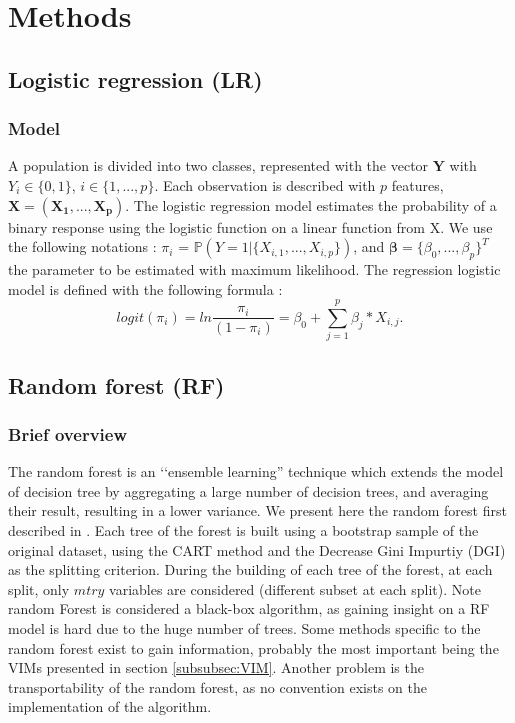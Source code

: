 \documentclass[12pt]{article}
\begin{document}
\newpage

\section{Methods}
\subsection{Logistic regression (LR)}
\subsubsection{Model}
A population is divided into two classes, represented with the vector $\bm{Y}$ with $Y_i\in\{{0,1}\}$, $i \in \{1,...,p\}$. Each observation is described with $p$ features, $\bm{X}=(\bm{X_1},...,\bm{X_p})$. The logistic regression model estimates the probability of a binary response using the logistic function on a linear function from X. We use the following notations : $\pi_{i}$ = $\mathbb{P}(Y=1|\{X_{i,1},...,X_{i,p}\})$, and $\bm{\beta} = \{\beta_0,...,\beta_p\}^T $ the parameter to be estimated with maximum likelihood. The regression logistic model is defined with the following formula :
\begin{equation}
	logit(\pi_{i}) = ln\frac{\pi_{i}}{(1-\pi_{i})} = \beta_{0} + \sum_{j=1}^p \beta_{j}*X_{i,j}.
\label{LogisticRegression}
\end{equation}


\subsection{Random forest (RF)}
\subsubsection{Brief overview}
The random forest is an \lq\lq ensemble learning'' technique which extends the model of decision tree by aggregating a large number of decision trees, and averaging their result, resulting in a lower variance. We present here the random forest first described in \cite{breiman2001random}. Each tree of the forest is built using a bootstrap sample of the original dataset, using the CART method and the Decrease Gini Impurtiy (DGI) as the splitting criterion. During the building of each tree of the forest, at each split, only $mtry$ variables are considered (different subset at each split). Note random Forest is considered a black-box algorithm, as gaining insight on a RF model is hard due to the huge number of trees. Some methods specific to the random forest exist to gain information, probably the most important being the VIMs presented in section \ref{subsubsec:VIM}. Another problem is the transportability of the random forest, as no convention exists on the implementation of the algorithm.
\end{document}
